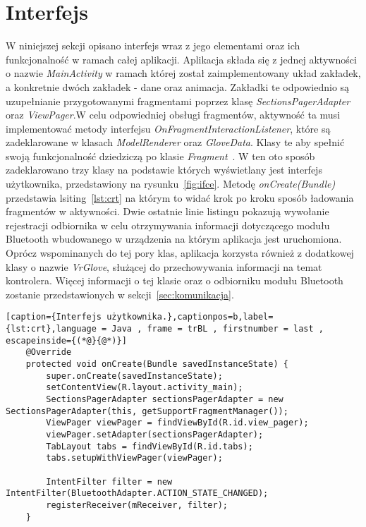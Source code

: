 \section{Interfejs}
\label{sec:interface}
W niniejszej sekcji opisano interfejs wraz z jego elementami oraz ich funkcjonalność w ramach całej aplikacji. Aplikacja składa się z jednej aktywności o nazwie \textit{MainActivity} w ramach której został zaimplementowany układ zakładek, a konkretnie dwóch zakładek - dane oraz animacja. Zakładki te odpowiednio są uzupełnianie przygotowanymi fragmentami poprzez klasę \textit{SectionsPagerAdapter} oraz \textit{ViewPager}.W celu odpowiedniej obsługi fragmentów, aktywność ta musi implementować metody interfejsu \textit{OnFragmentInteractionListener}, które są zadeklarowane w klasach \textit{ModelRenderer} oraz \textit{GloveData}. Klasy te aby spełnić swoją funkcjonalność dziedziczą po klasie \textit{Fragment}~\cite{AndroidDoc}. W ten oto sposób zadeklarowano trzy klasy na podstawie których wyświetlany jest interfejs użytkownika, przedstawiony na rysunku~\ref{fig:ifce}. Metodę \textit{onCreate(Bundle)} przedstawia lsiting~\ref{lst:crt} na którym to widać krok po kroku sposób ładowania fragmentów w aktywności. Dwie ostatnie linie listingu pokazują wywołanie rejestracji odbiornika w celu otrzymywania informacji dotyczącego modułu Bluetooth wbudowanego w urządzenia na którym aplikacja jest uruchomiona. Oprócz wspominanych do tej pory klas, aplikacja korzysta również z dodatkowej klasy o nazwie \textit{VrGlove}, służącej do przechowywania informacji na temat kontrolera. Więcej informacji o tej klasie oraz o odbiorniku modułu Bluetooth zostanie przedstawionych w sekcji~\ref{sec:komunikacja}. 
\begin{lstlisting}[caption={Interfejs użytkownika.},captionpos=b,label={lst:crt},language = Java , frame = trBL , firstnumber = last , escapeinside={(*@}{@*)}]
    @Override
    protected void onCreate(Bundle savedInstanceState) {
        super.onCreate(savedInstanceState);
        setContentView(R.layout.activity_main);
        SectionsPagerAdapter sectionsPagerAdapter = new SectionsPagerAdapter(this, getSupportFragmentManager());
        ViewPager viewPager = findViewById(R.id.view_pager);
        viewPager.setAdapter(sectionsPagerAdapter);
        TabLayout tabs = findViewById(R.id.tabs);
        tabs.setupWithViewPager(viewPager);

        IntentFilter filter = new IntentFilter(BluetoothAdapter.ACTION_STATE_CHANGED);
        registerReceiver(mReceiver, filter);
    }
\end{lstlisting}


